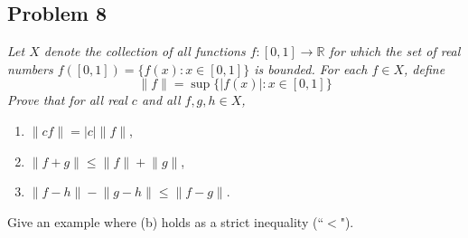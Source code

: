 \documentclass{article}
\newcommand{\R}{{\mathbb R}}
\begin{document}
\subsection*{Problem 8}
{\it Let $X$ denote the collection of all functions $f \colon [0,1] \to \R$
for which the set of real numbers $f([0,1]) = \{f(x) \colon x \in [0,1]\}$ is bounded.
For each $f \in X$, define
\[
	\lVert f \rVert = \sup\{|f(x)| \colon x \in [0,1]\}
\]
Prove that for all real $c$ and all $f,g,h \in X$,
\begin{enumerate}
	\item $\lVert cf \rVert = |c|\lVert f \rVert$,
	\item $\lVert f + g \rVert \leq \lVert f \rVert + \lVert g \rVert$,
	\item $\lVert f - h \rVert - \lVert g - h\rVert \leq \lVert f - g\rVert$.
\end{enumerate}
Give an example where (b) holds as a strict inequality (``$<$").}
\end{document}
